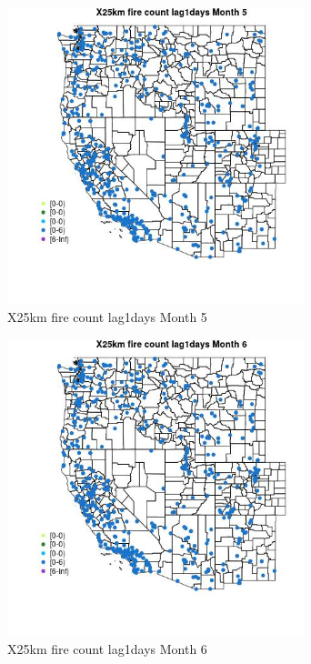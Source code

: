 \begin{figure} 
\centering  
\includegraphics[width=0.77\textwidth]{Code_Outputs/Report_ML_input_PM25_Step4_part_e_de_duplicated_aves_compiled_2019-05-14wNAs_MapObsMo5X25km_fire_count_lag1days.jpg} 
\caption{\label{fig:Report_ML_input_PM25_Step4_part_e_de_duplicated_aves_compiled_2019-05-14wNAsMapObsMo5X25km_fire_count_lag1days}X25km fire count lag1days Month 5} 
\end{figure} 
 

\begin{figure} 
\centering  
\includegraphics[width=0.77\textwidth]{Code_Outputs/Report_ML_input_PM25_Step4_part_e_de_duplicated_aves_compiled_2019-05-14wNAs_MapObsMo6X25km_fire_count_lag1days.jpg} 
\caption{\label{fig:Report_ML_input_PM25_Step4_part_e_de_duplicated_aves_compiled_2019-05-14wNAsMapObsMo6X25km_fire_count_lag1days}X25km fire count lag1days Month 6} 
\end{figure} 
 

